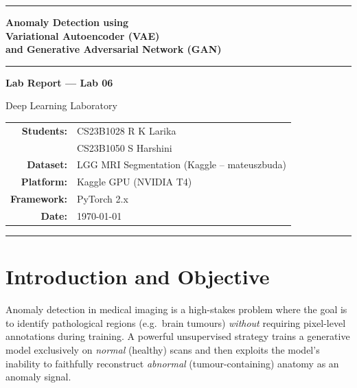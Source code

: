 \documentclass[12pt,a4paper]{article}
\begin{document}
\begin{titlepage}
\centering
\vspace*{1.8cm}

{\color{darkblue}\rule{\linewidth}{2pt}}
\vspace{0.9cm}

{\Huge\bfseries\color{darkblue}
    Anomaly Detection using\\[0.4em]
    Variational Autoencoder (VAE)\\[0.4em]
    and Generative Adversarial Network (GAN)
}

\vspace{0.7cm}
{\color{steelblue}\rule{\linewidth}{1pt}}
\vspace{1.2cm}

{\LARGE\bfseries Lab Report --- Lab 06}

\vspace{0.4cm}
{\large Deep Learning Laboratory}

\vspace{1.8cm}

\begin{tabular}{rl}
    \textbf{Students:}   & CS23B1028 \quad R K Larika \\[4pt]
                         & CS23B1050 \quad S Harshini  \\[12pt]
    \textbf{Dataset:}    & LGG MRI Segmentation (Kaggle -- mateuszbuda) \\[4pt]
    \textbf{Platform:}   & Kaggle GPU (NVIDIA T4) \\[4pt]
    \textbf{Framework:}  & PyTorch 2.x \\[4pt]
    \textbf{Date:}       & \today
\end{tabular}

\vfill
{\color{darkblue}\rule{\linewidth}{2pt}}
\end{titlepage}

\tableofcontents
\newpage

\section{Introduction and Objective}

Anomaly detection in medical imaging is a high-stakes problem where the goal is to identify
pathological regions (e.g.\ brain tumours) \textit{without} requiring pixel-level annotations
during training.  A powerful unsupervised strategy trains a generative model exclusively on
\emph{normal} (healthy) scans and then exploits the model's inability to faithfully reconstruct
\emph{abnormal} (tumour-containing) anatomy as an anomaly signal.
\end{document}
